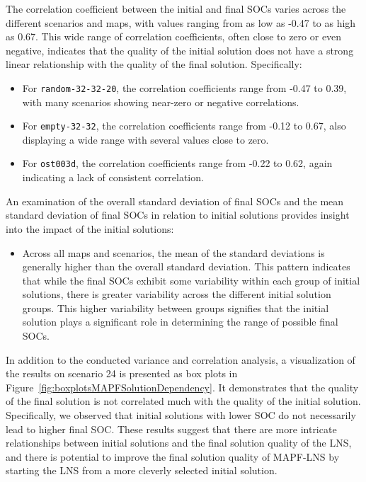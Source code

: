 \documentclass[runningheads]{llncs}
\begin{document}
The correlation coefficient between the initial and final SOCs varies across the different scenarios and maps, with values ranging from as low as -0.47 to as high as 0.67. This wide range of correlation coefficients, often close to zero or even negative, indicates that the quality of the initial solution does not have a strong linear relationship with the quality of the final solution. 
Specifically:
\begin{itemize}
    \item For \texttt{random-32-32-20}, the correlation coefficients range from -0.47 to 0.39, with many scenarios showing near-zero or negative correlations.
    \item For \texttt{empty-32-32}, the correlation coefficients range from -0.12 to 0.67, also displaying a wide range with several values close to zero.
    \item For \texttt{ost003d}, the correlation coefficients range from -0.22 to 0.62, again indicating a lack of consistent correlation.
\end{itemize}

An examination of the overall standard deviation of final SOCs and the mean standard deviation of final SOCs in relation to initial solutions provides insight into the impact of the initial solutions:

\begin{itemize}
    \item Across all maps and scenarios, the mean of the standard deviations is generally higher than the overall standard deviation. This pattern indicates that while the final SOCs exhibit some variability within each group of initial solutions, there is greater variability across the different initial solution groups. This higher variability between groups signifies that the initial solution plays a significant role in determining the range of possible final SOCs.
\end{itemize}
    
    
In addition to the conducted variance and correlation analysis, a visualization of the results on scenario 24 is presented as box plots in Figure~\ref{fig:boxplotsMAPFSolutionDependency}. It demonstrates that the quality of the final solution is not correlated much with the quality of the initial solution. Specifically, we observed that initial solutions with lower SOC do not necessarily lead to higher final SOC. These results suggest that there are more intricate relationships between initial solutions and the final solution quality of the LNS, and there is potential to improve the final solution quality of MAPF-LNS by starting the LNS from a more cleverly selected initial solution.
\end{document}
